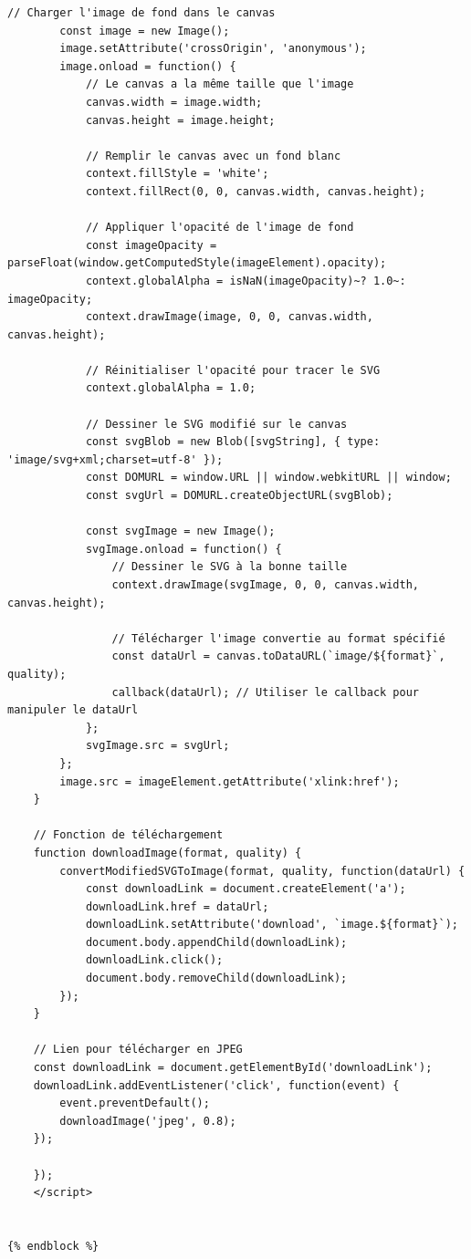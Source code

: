 \begin{lstlisting}[language=HTML5, frame=single, breaklines=true, caption={\textit{Template} \html pour la manipulation des fichiers \svgs.}]
        // Charger l'image de fond dans le canvas
        const image = new Image();
        image.setAttribute('crossOrigin', 'anonymous');
        image.onload = function() {
            // Le canvas a la même taille que l'image
            canvas.width = image.width;
            canvas.height = image.height;

            // Remplir le canvas avec un fond blanc
            context.fillStyle = 'white';
            context.fillRect(0, 0, canvas.width, canvas.height);

            // Appliquer l'opacité de l'image de fond
            const imageOpacity = parseFloat(window.getComputedStyle(imageElement).opacity);
            context.globalAlpha = isNaN(imageOpacity)~? 1.0~: imageOpacity;
            context.drawImage(image, 0, 0, canvas.width, canvas.height);

            // Réinitialiser l'opacité pour tracer le SVG
            context.globalAlpha = 1.0;

            // Dessiner le SVG modifié sur le canvas
            const svgBlob = new Blob([svgString], { type: 'image/svg+xml;charset=utf-8' });
            const DOMURL = window.URL || window.webkitURL || window;
            const svgUrl = DOMURL.createObjectURL(svgBlob);

            const svgImage = new Image();
            svgImage.onload = function() {
                // Dessiner le SVG à la bonne taille
                context.drawImage(svgImage, 0, 0, canvas.width, canvas.height);

                // Télécharger l'image convertie au format spécifié
                const dataUrl = canvas.toDataURL(`image/${format}`, quality);
                callback(dataUrl); // Utiliser le callback pour manipuler le dataUrl
            };
            svgImage.src = svgUrl;
        };
        image.src = imageElement.getAttribute('xlink:href');
    }

    // Fonction de téléchargement
    function downloadImage(format, quality) {
        convertModifiedSVGToImage(format, quality, function(dataUrl) {
            const downloadLink = document.createElement('a');
            downloadLink.href = dataUrl;
            downloadLink.setAttribute('download', `image.${format}`);
            document.body.appendChild(downloadLink);
            downloadLink.click();
            document.body.removeChild(downloadLink);
        });
    }

    // Lien pour télécharger en JPEG
    const downloadLink = document.getElementById('downloadLink');
    downloadLink.addEventListener('click', function(event) {
        event.preventDefault();
        downloadImage('jpeg', 0.8);
    });

    });
    </script>


{% endblock %}

\end{lstlisting}

